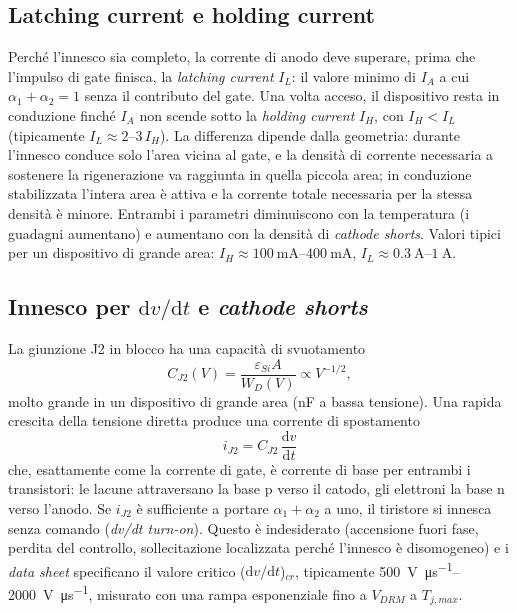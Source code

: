 \documentclass[11pt,a4paper]{article}
\newcommand{\IA}{\ensuremath{I_A}}
\newcommand{\IH}{\ensuremath{I_H}}
\newcommand{\IL}{\ensuremath{I_L}}
\newcommand{\VDRM}{\ensuremath{V_{DRM}}}
\newcommand{\dvdt}{\ensuremath{\mathrm{d}v/\mathrm{d}t}}
\newcommand{\dd}{\mathrm{d}}
\newcommand{\en}[1]{\emph{#1}}   %
\begin{document}
\subsection{Latching current e holding current}
Perché l'innesco sia completo, la corrente di anodo deve superare, prima che l'impulso di gate finisca, la \en{latching current} $\IL$: il valore minimo di $\IA$ a cui $\alpha_1+\alpha_2=1$ senza il contributo del gate. Una volta acceso, il dispositivo resta in conduzione finché $\IA$ non scende sotto la \en{holding current} $\IH$, con $\IH<\IL$ (tipicamente $\IL\approx\numrange{2}{3}\,\IH$). La differenza dipende dalla geometria: durante l'innesco conduce solo l'area vicina al gate, e la densità di corrente necessaria a sostenere la rigenerazione va raggiunta in quella piccola area; in conduzione stabilizzata l'intera area è attiva e la corrente totale necessaria per la stessa densità è minore. Entrambi i parametri diminuiscono con la temperatura (i guadagni aumentano) e aumentano con la densità di \en{cathode shorts}. Valori tipici per un dispositivo di grande area: $\IH\approx\qtyrange{100}{400}{\mA}$, $\IL\approx\qtyrange{0.3}{1}{\A}$.

\subsection{Innesco per \texorpdfstring{$\dvdt$}{dv/dt} e \en{cathode shorts}}
\label{sec:dvdt}
La giunzione J2 in blocco ha una capacità di svuotamento
\begin{equation}
  C_{J2}(V) = \frac{\varepsilon_{Si} A}{W_D(V)} \propto V^{-1/2},
\end{equation}
molto grande in un dispositivo di grande area (nF a bassa tensione). Una rapida crescita della tensione diretta produce una corrente di spostamento
\begin{equation}
  i_{J2} = C_{J2}\,\frac{\dd v}{\dd t}
\end{equation}
che, esattamente come la corrente di gate, è corrente di base per entrambi i transistori: le lacune attraversano la base p verso il catodo, gli elettroni la base n verso l'anodo. Se $i_{J2}$ è sufficiente a portare $\alpha_1+\alpha_2$ a uno, il tiristore si innesca senza comando (\en{dv/dt turn-on}). Questo è indesiderato (accensione fuori fase, perdita del controllo, sollecitazione localizzata perché l'innesco è disomogeneo) e i \en{data sheet} specificano il valore critico ($\dvdt$)$_{cr}$, tipicamente \qtyrange{500}{2000}{\V\per\us}, misurato con una rampa esponenziale fino a $\VDRM$ a $T_{j,max}$.
\end{document}
